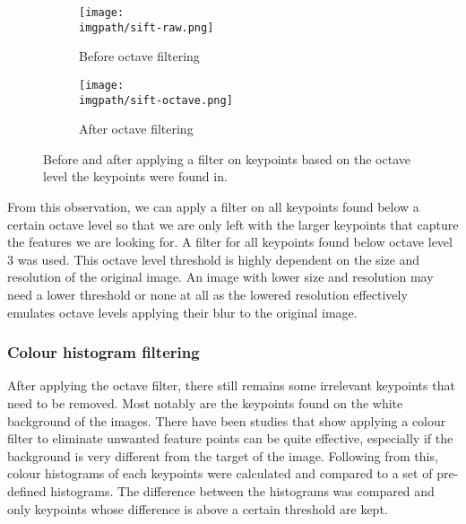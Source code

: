 \begin{figure}[H]
	\begin{subfigure}{0.5\textwidth}
	\texttt{[image: \\imgpath/sift-raw.png]}
	\caption{Before octave filtering}
	\end{subfigure}
	\hspace*{\fill}
	\begin{subfigure}{0.5\textwidth}
	\texttt{[image: \\imgpath/sift-octave.png]}
	\caption{After octave filtering}
	\end{subfigure}
\caption{Before and after applying a filter on keypoints based on the octave level the keypoints were found in.}
\end{figure}
\noindent
From this observation, we can apply a filter on all keypoints found below a certain octave level so that we are only left with the larger keypoints that capture the features we are looking for. A filter for all keypoints found below octave level 3 was used. This octave level threshold is highly dependent on the size and resolution of the original image. An image with lower size and resolution may need a lower threshold or none at all as the lowered resolution effectively emulates octave levels applying their blur to the original image. 


\subsubsection{Colour histogram filtering}
After applying the octave filter, there still remains some irrelevant keypoints that need to be removed. Most notably are the keypoints found on the white background of the images. There have been studies \cite{color-histogram, color-filter} that show applying a colour filter to eliminate unwanted feature points can be quite effective, especially if the background is very different from the target of the image. Following from this, colour histograms of each keypoints were calculated and compared to a set of pre-defined histograms. The difference between the histograms was compared and only keypoints whose difference is above a certain threshold are kept. 

